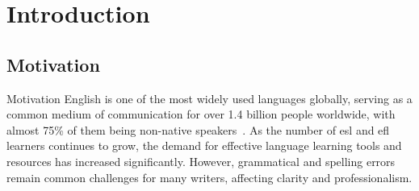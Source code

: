 \section{Introduction}

\subsection{Motivation}
\begin{frame}{Motivation}
  English is one of the most widely used languages globally, serving as a common medium of communication for over \alert{1.4 billion} people worldwide, with almost \alert{75\%} of them being non-native speakers~\cite{eberhard2015ethnologue}.
  As the number of esl and efl learners continues to grow, the demand for effective language learning tools and resources has increased significantly.
  However, grammatical and spelling errors remain common challenges for many writers, affecting clarity and professionalism.
\end{frame}
